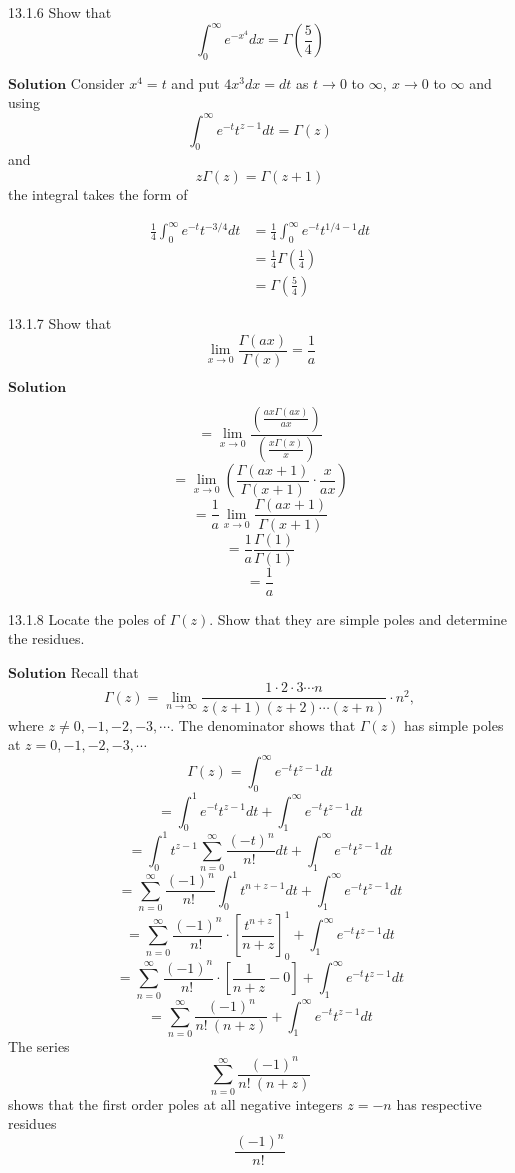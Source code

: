\newpage

\begin{mybox}{13.1.6}
Show that
$$
\int_{0}^{\infty} e^{-x^{4}} d x=\Gamma\left(\frac{5}{4}\right)
$$
\end{mybox}

$\boxed{\textbf{Solution}}$ Consider $x^{4}=t$ and put $4x^3 dx = dt$ as $t \rightarrow 0$ to $\infty, \  x \rightarrow 0$ to $\infty$ and using
$$
\int_{0}^{\infty} e^{-t} t^{z-1} d t=\Gamma (z)
$$
and
$$
z \Gamma (z)=\Gamma(z+1)
$$
the integral takes the form of

$$\begin{aligned} \frac{1}{4} \int_{0}^{\infty} e^{-t} t^{-3 / 4} d t &=\frac{1}{4} \int_{0}^{\infty} e^{-t} t^{1 / 4-1} d t \\ &=\frac{1}{4} \Gamma\left(\frac{1}{4}\right) \\ &=\Gamma\left(\frac{5}{4}\right) \end{aligned}$$

\newpage


\begin{mybox}{13.1.7}
Show that
$$
\lim _{x \rightarrow 0} \frac{\Gamma(a x)}{\Gamma(x)}=\frac{1}{a}
$$
\end{mybox}

$\boxed{\textbf{Solution}}$ 

$$=\lim _{x \rightarrow 0} \frac{\left(\frac{a x \Gamma(a x)}{a x}\right)}{\left(\frac{x \Gamma(x)}{x}\right)}$$
$$=\lim _{x \rightarrow 0}\left(\frac{\Gamma(a x+1)}{\Gamma(x+1)} \cdot \frac{x}{a x}\right)$$
$$=\frac{1}{a} \lim _{x \rightarrow 0} \frac{\Gamma(a x+1)}{\Gamma(x+1)}$$
$$=\frac{1}{a} \frac{\Gamma(1)}{\Gamma(1)}$$
$$=\frac{1}{a}$$

\newpage


\begin{mybox}{13.1.8}
Locate the poles of $\Gamma(z)$. Show that they are simple poles and determine the residues.
\end{mybox}
$\boxed{\textbf{Solution}}$
Recall that 
$$\Gamma(z)=\lim _{n \rightarrow \infty} \frac{1 \cdot 2 \cdot 3  \cdots  n}{z(z+1)(z+2) \cdots(z+n)} \cdot n^{2},$$ where $z \neq 0,-1,-2,-3, \cdots$. The denominator shows that $\Gamma(z)$ has simple poles at $z=0,-1,-2,-3, \cdots$
$$\Gamma(z)=\int_{0}^{\infty} e^{-t} t^{z-1} d t$$
$$=\int_{0}^{1} e^{-t} t^{z-1} d t+\int_{1}^{\infty} e^{-t} t^{z-1} d t$$
$$=\int_{0}^{1} t^{z-1} \sum_{n=0}^{\infty} \frac{(-t)^{n}}{n! \ } d t+\int_{1}^{\infty} e^{-t} t^{z-1} d t$$
$$=\sum_{n=0}^{\infty} \frac{(-1)^{n}}{n! \ } \int_{0}^{1} t^{n+z-1} d t+\int_{1}^{\infty} e^{-t} t^{z-1} d t$$
$$=\sum_{n=0}^{\infty} \frac{(-1)^{n}}{n! \ } \cdot\left[\frac{t^{n+z}}{n+z}\right]_{0}^{1}+\int_{1}^{\infty} e^{-t} t^{z-1} d t$$
$$=\sum_{n=0}^{\infty} \frac{(-1)^{n}}{n! \ } \cdot\left[\frac{1}{n+z}-0\right]+\int_{1}^{\infty} e^{-t} t^{z-1} d t$$
$$=\sum_{n=0}^{\infty} \frac{(-1)^{n}}{n! \ (n+z)}+\int_{1}^{\infty} e^{-t} t^{z-1} d t$$
The series 
$$\sum_{n=0}^{\infty} \frac{(-1)^{n}}{n! \ (n+z)}$$ 
shows that the first order poles at all negative integers $z=-n$ has respective residues 
$$\frac{(-1)^{n}}{n! \ }$$

